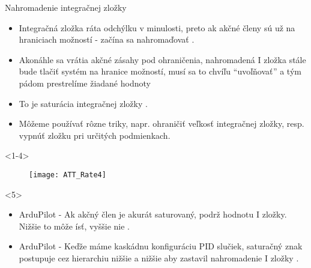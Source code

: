 \begin{frame}[t]{Nahromadenie integračnej zložky}
  \begin{itemize}
    \item<1-> Integračná zložka ráta odchýlku v minulosti, preto ak akčné členy sú už na hraniciach možností - začína sa nahromaďovať .
    \item<2-> Akonáhle sa vrátia akčné zásahy pod ohraničenia, nahromadená I zložka stále bude tlačiť systém na hranice možností, musí sa to chvíľu ``uvoľňovať''  a tým pádom prestrelíme  žiadané hodnoty
    \item<3-> To je saturácia integračnej zložky .
    \item<4-> Môžeme používať rôzne triky, napr. ohraničiť veľkosť integračnej zložky, resp. vypnúť zložku pri určitých podmienkach.
  \end{itemize}
      \begin{onlyenv}<1-4>
  \begin{figure}
\centering
  \texttt{[image: ATT\_Rate4]}\\
\end{figure}
\end{onlyenv}

      \begin{onlyenv}<5>
        \begin{itemize}
  \item<1-> ArduPilot - Ak akčný člen je akurát saturovaný, podrž hodnotu I zložky. Nižšie to môže ísť, vyššie nie \citep{AP:PID}.
  \item<2-> ArduPilot - Keďže máme kaskádnu konfiguráciu PID slučiek, saturačný znak postupuje cez hierarchiu nižšie a nižšie aby zastavil nahromadenie I zložky \citep{AP:PID}.
            \end{itemize}
      \end{onlyenv}

\end{frame}



